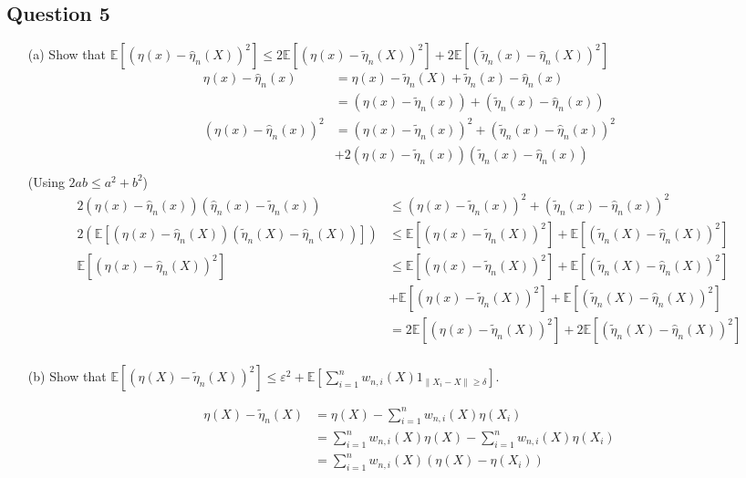 \documentclass[12pt]{article}
\begin{document}
\subsection*{Question 5}
\begin{enumerate}
\item[(a)]
Show that $\mathbb{E}[(\eta(x) - \hat{\eta}_n(X))^2] \leq 2\mathbb{E}[(\eta(x) - \tilde{\eta}_n(X))^2] + 2\mathbb{E}[(\tilde{\eta}_n(x) - \hat{\eta}_n(X))^2]$ 
\begin{align*}
	\eta(x) - \hat{\eta}_n(x) &= \eta(x) - \tilde{\eta}_n(X) + \tilde{\eta}_n(x) - \hat{\eta}_n(x)\\
	 &= (\eta(x) - \tilde{\eta}_n(x)) + (\tilde{\eta}_n(x) - \hat{\eta}_n(x))\\
	 (\eta(x) - \hat{\eta}_n(x))^2 &= (\eta(x) - \tilde{\eta}_n(x))^2 + (\tilde{\eta}_n(x) - \hat{\eta}_n(x))^2 \\
	 &+ 2(\eta(x) - \tilde{\eta}_n(x))(\tilde{\eta}_n(x) - \hat{\eta}_n(x))\\
\end{align*}
(Using $2ab \leq a^2 + b^2$)
\begin{align*}
	 2(\eta(x) - \hat{\eta}_n(x))(\hat{\eta}_n(x) - \tilde{\eta}_n(x)) &\leq (\eta(x) - \tilde{\eta}_n(x))^2 + (\tilde{\eta}_n(x) - \hat{\eta}_n(x))^2 \\
	 2(\mathbb{E}[(\eta(x) - \hat{\eta}_n(X))(\tilde{\eta}_n(X) - \hat{\eta}_n(X))]) &\leq \mathbb{E}[(\eta(x) - \tilde{\eta}_n(X))^2] + \mathbb{E}[(\tilde{\eta}_n(X) - \hat{\eta}_n(X))^2]\\
	 \mathbb{E}[(\eta(x) - \hat{\eta}_n(X))^2] &\leq \mathbb{E}[(\eta(x) - \tilde{\eta}_n(X))^2] + \mathbb{E}[(\tilde{\eta}_n(X) - \hat{\eta}_n(X))^2]\\
	 &+ \mathbb{E}[(\eta(x) - \tilde{\eta}_n(X))^2] + \mathbb{E}[(\tilde{\eta}_n(X) - \hat{\eta}_n(X))^2]\\
	 &= 2\mathbb{E}[(\eta(x) - \tilde{\eta}_n(X))^2] + 2\mathbb{E}[(\tilde{\eta}_n(X) - \hat{\eta}_n(X))^2]\\
	\end{align*}
\item[(b)] Show that $\mathbb{E}[(\eta(X) - \tilde{\eta}_n(X))^2] \leq \varepsilon^2 + \mathbb{E}\left[\sum_{i=1}^{n} w_{n,i}(X)1_{\|X_i - X\| \geq \delta}\right]$.

\begin{align*}
\eta(X) - \tilde{\eta}_n(X) &= \eta(X) - \sum_{i=1}^n w_{n,i}(X) \eta(X_i)\\
&= \sum_{i=1}^n w_{n,i}(X) \eta(X) - \sum_{i=1}^n w_{n,i}(X) \eta(X_i)\\
&= \sum_{i=1}^n w_{n,i}(X)(\eta(X) - \eta(X_i))
\end{align*}


\end{enumerate}
\end{document}
